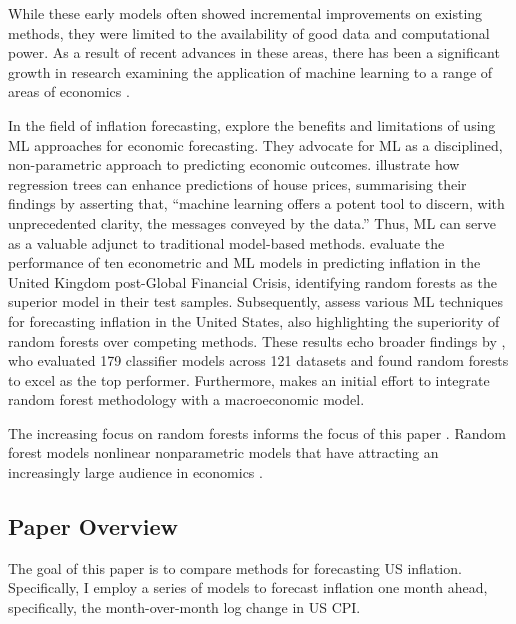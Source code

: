 While these early models often showed incremental improvements on existing methods, they were limited to the availability of good data and computational power. As a result of recent advances in these areas, there has been a significant growth in research examining the application of machine learning to a range of areas of economics \autocite{Athey2019TheEconomics}.

In the field of inflation forecasting, \textcite{Kleinberg2015PredictionProblems} explore the benefits and limitations of using ML approaches for economic forecasting. They advocate for ML as a disciplined, non-parametric approach to predicting economic outcomes. \textcite{Mullainathan2017MachineApproach} illustrate how regression trees can enhance predictions of house prices, summarising their findings by asserting that, ``machine learning offers a potent tool to discern, with unprecedented clarity, the messages conveyed by the data.” Thus, ML can serve as a valuable adjunct to traditional model-based methods. \textcite{Chakraborty2017MachineBanks} evaluate the performance of ten econometric and ML models in predicting inflation in the United Kingdom post-Global Financial Crisis, identifying random forests as the superior model in their test samples. Subsequently, \textcite{Medeiros2021ForecastingMethods} assess various ML techniques for forecasting inflation in the United States, also highlighting the superiority of random forests over competing methods. These results echo broader findings by \textcite{Fernandez-Delgado2014DoProblems}, who evaluated 179 classifier models across 121 datasets and found random forests to excel as the top performer. Furthermore, \textcite{GouletCoulombe2024TheForest} makes an initial effort to integrate random forest methodology with a macroeconomic model. 

The increasing focus on random forests informs the focus of this paper \autocite{Kohlscheen2021WhatInflation}. Random forest models nonlinear nonparametric models that have attracting an increasingly large audience in economics \autocite{Athey2019TheEconomics}.

\subsection{Paper Overview}

The goal of this paper is to compare methods for forecasting US inflation. Specifically, I employ a series of models to forecast inflation one month ahead, specifically, the month-over-month log change in US CPI. 


